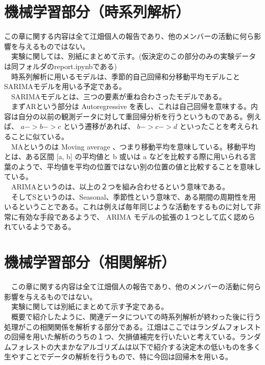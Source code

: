 \documentclass{scrartcl}
\begin{document}
\begin{table}[htbp]
\section{機械学習部分（時系列解析）}
\label{sec:org5f136a4}
  この章に関する内容は全て江畑個人の報告であり、他のメンバーの活動に何ら影響を与えるものではない。\\
　実験に関しては、別紙にまとめて示す。(仮決定のこの部分のみの実験データは同フォルダのreport.ipynbである)\\
　時系列解析に用いるモデルは、季節的自己回帰和分移動平均モデルことSARIMAモデルを用いる予定である。\\
　SARIMAモデルとは、三つの要素が重ね合わさったモデルである。\\
　まずARという部分は Autoregressive を表し、これは自己回帰を意味する。内容は自分の以前の観測データに対して重回帰分析を行うというものである。例えば、 \(a->b->c\) という遷移があれば、 \(b->c->d\) といったことを考えられることに似ている。\\
　MAというのは Moving average 、つまり移動平均を意味している。移動平均とは、ある区間 [a, b] の平均値と b 或いは a などを比較する際に用いられる言葉のようで、平均値を平均の位置ではない別の位置の値と比較することを意味している。\\
　ARIMAというのは、以上の２つを組み合わせるという意味である。\\
　そしてSというのは、Seasonal、季節性という意味で、ある期間の周期性を用いるということである。これは例えば毎年同じような活動をするものに対して非常に有効な手段であるようで、 ARIMA モデルの拡張の１つとして広く認められているようである。\\

\section{機械学習部分（相関解析）}
\label{sec:org5c5dcc0}
　この章に関する内容は全て江畑個人の報告であり、他のメンバーの活動に何ら影響を与えるものではない。\\
　実験に関しては別紙にまとめて示す予定である。\\
　概要で紹介したように、関連データについての時系列解析が終わった後に行う処理がこの相関関係を解析する部分である。江畑はここではランダムフォレストの回帰を用いた解析のうちの１つ、欠損値補完を行いたいと考えている。ランダムフォレストの大まかなアルゴリズムは以下で紹介する決定木の低いものを多く生やすことでデータの解析を行うもので、特に今回は回帰木を用いる。\\


\end{table}
\end{document}
